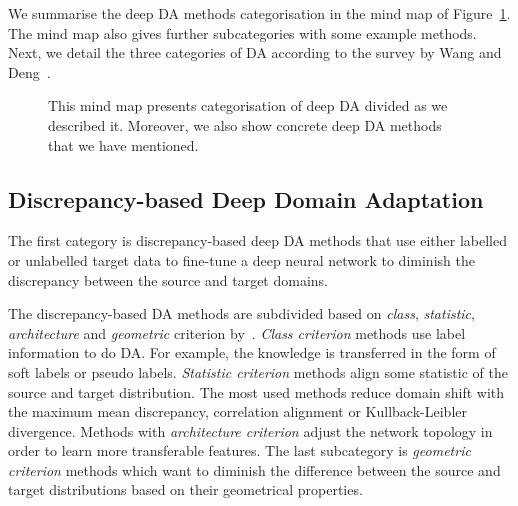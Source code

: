 We summarise the deep DA methods categorisation in the mind map of Figure~\ref{mind_map}.
The mind map also gives further subcategories with some example methods.
Next, we detail the three categories of DA according to the survey by Wang and Deng~\cite{wang2018}.

\begin{figure}
\caption[Mind map of deep domain adaptation]{
	This mind map presents categorisation of deep DA divided as we described it.
	Moreover, we also show concrete deep DA methods
	that we have mentioned.
}
\label{mind_map}
\end{figure}

\subsection{Discrepancy-based Deep Domain Adaptation}
\label{discrepancy_da}

The first category is discrepancy-based deep DA methods
that use either labelled or unlabelled target data
to fine-tune a deep neural network to diminish the discrepancy
between the source and target domains.

The discrepancy-based DA methods are subdivided based on \textit{class}, \textit{statistic}, \textit{architecture} and \textit{geometric} criterion by~\cite{wang2018}.
\textit{Class criterion} methods use label information to do DA.
For example, the knowledge is transferred in the form of soft labels or pseudo labels.
\textit{Statistic criterion} methods align some statistic of the source and target distribution.
The most used methods reduce domain shift with the maximum mean discrepancy, correlation alignment or Kullback-Leibler divergence.
Methods with \textit{architecture criterion} adjust the network topology in order to learn more transferable features.
The last subcategory is \textit{geometric criterion} methods
which want to diminish the difference between the source and target distributions based on their geometrical properties.

